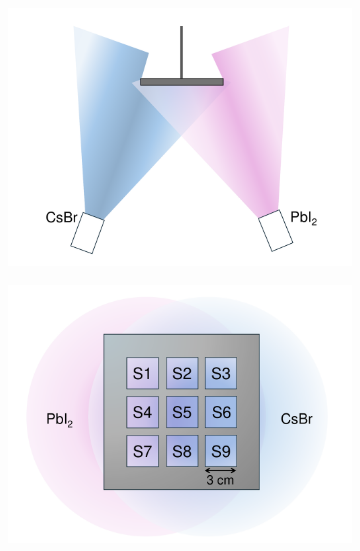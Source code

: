 \begin{figure}[htbp]
    \centering
    \begin{subfigure}[t]{0.49\textwidth} %
        \centering
        \includegraphics[width=\textwidth]{chapters/stability/imeges/Chamber - Side View.pdf} %
        \caption{}
        \label{}
    \end{subfigure}
    \begin{subfigure}[t]{0.49\textwidth} %
        \centering
        \includegraphics[width=\textwidth]{chapters/stability/imeges/Holder - Gradient - Schematic.pdf} %
        \caption{}        
        \label{}
    \end{subfigure}


\end{figure}
